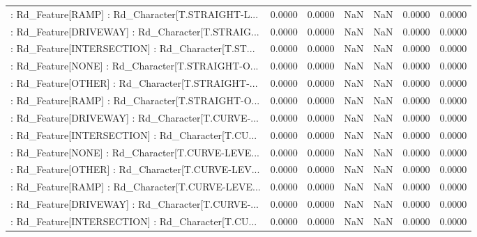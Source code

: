 \begin{longtable}{p{4cm}cccccc}
 : Rd\_Feature[RAMP] : Rd\_Character[T.STRAIGHT-L... &            0.0000 &            0.0000 &     NaN &          NaN &             0.0000 &            0.0000 \\
 : Rd\_Feature[DRIVEWAY] : Rd\_Character[T.STRAIG... &            0.0000 &            0.0000 &     NaN &          NaN &             0.0000 &            0.0000 \\
 : Rd\_Feature[INTERSECTION] : Rd\_Character[T.ST... &            0.0000 &            0.0000 &     NaN &          NaN &             0.0000 &            0.0000 \\
 : Rd\_Feature[NONE] : Rd\_Character[T.STRAIGHT-O... &            0.0000 &            0.0000 &     NaN &          NaN &             0.0000 &            0.0000 \\
 : Rd\_Feature[OTHER] : Rd\_Character[T.STRAIGHT-... &            0.0000 &            0.0000 &     NaN &          NaN &             0.0000 &            0.0000 \\
 : Rd\_Feature[RAMP] : Rd\_Character[T.STRAIGHT-O... &            0.0000 &            0.0000 &     NaN &          NaN &             0.0000 &            0.0000 \\
 : Rd\_Feature[DRIVEWAY] : Rd\_Character[T.CURVE-... &            0.0000 &            0.0000 &     NaN &          NaN &             0.0000 &            0.0000 \\
 : Rd\_Feature[INTERSECTION] : Rd\_Character[T.CU... &            0.0000 &            0.0000 &     NaN &          NaN &             0.0000 &            0.0000 \\
 : Rd\_Feature[NONE] : Rd\_Character[T.CURVE-LEVE... &            0.0000 &            0.0000 &     NaN &          NaN &             0.0000 &            0.0000 \\
 : Rd\_Feature[OTHER] : Rd\_Character[T.CURVE-LEV... &            0.0000 &            0.0000 &     NaN &          NaN &             0.0000 &            0.0000 \\
 : Rd\_Feature[RAMP] : Rd\_Character[T.CURVE-LEVE... &            0.0000 &            0.0000 &     NaN &          NaN &             0.0000 &            0.0000 \\
 : Rd\_Feature[DRIVEWAY] : Rd\_Character[T.CURVE-... &            0.0000 &            0.0000 &     NaN &          NaN &             0.0000 &            0.0000 \\
 : Rd\_Feature[INTERSECTION] : Rd\_Character[T.CU... &            0.0000 &            0.0000 &     NaN &          NaN &             0.0000 &            0.0000 \\

\end{longtable}
